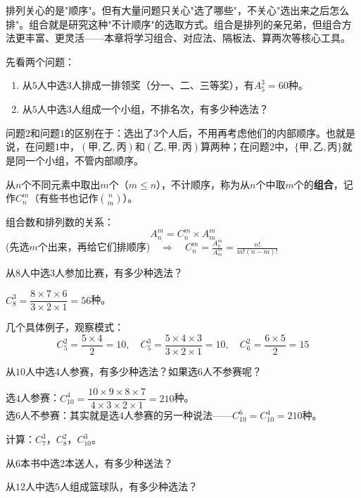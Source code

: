 
排列关心的是"顺序"。但有大量问题只关心"选了哪些"，不关心"选出来之后怎么排"。组合就是研究这种"不计顺序"的选取方式。组合是排列的亲兄弟，但组合方法更丰富、更灵活——本章将学习组合、对应法、隔板法、算两次等核心工具。


先看两个问题：
\begin{enumerate}
\item 从$5$人中选$3$人排成一排领奖（分一、二、三等奖），有$A_5^3=60$种。
\item 从$5$人中选$3$人组成一个小组，不排名次，有多少种选法？
\end{enumerate}

问题$2$和问题$1$的区别在于：选出了$3$个人后，不用再考虑他们的内部顺序。也就是说，在问题$1$中，$(甲,乙,丙)$和$(乙,甲,丙)$算两种；在问题$2$中，$\{甲,乙,丙\}$就是同一个小组，不管内部顺序。

从$n$个不同元素中取出$m$个（$m\le n$），不计顺序，称为从$n$个中取$m$个的\textbf{组合}，记作$C_n^m$（有些书也记作$\binom{n}{m}$）。

组合数和排列数的关系：
\[
A_n^m = C_n^m \times A_m^m
\]
(先选$m$个出来，再给它们排顺序)$\quad\Rightarrow\quad
C_n^m = \frac{A_n^m}{A_m^m} = \frac{n!}{m!(n-m)!}
$

\begin{example}
从$8$人中选$3$人参加比赛，有多少种选法？
\end{example}
\begin{solution}
$C_8^3 = \dfrac{8\times7\times6}{3\times2\times1} = 56$种。
\end{solution}

几个具体例子，观察模式：
\[
C_5^2 = \frac{5\times4}{2}=10,\quad
C_5^3 = \frac{5\times4\times3}{3\times2\times1}=10,\quad
C_6^2 = \frac{6\times5}{2}=15
\]

\begin{example}
从$10$人中选$4$人参赛，有多少种选法？如果选$6$人不参赛呢？
\end{example}
\begin{solution}
选$4$人参赛：$C_{10}^4 = \dfrac{10\times9\times8\times7}{4\times3\times2\times1} = 210$种。\\
选$6$人不参赛：其实就是选$4$人参赛的另一种说法——$C_{10}^6 = C_{10}^4 = 210$种。
\end{solution}

\begin{exercise}
\item 计算：$C_7^3$，$C_8^2$，$C_{10}^3$。
\item 从$6$本书中选$2$本送人，有多少种送法？
\item 从$12$人中选$5$人组成篮球队，有多少种选法？
\end{exercise}

